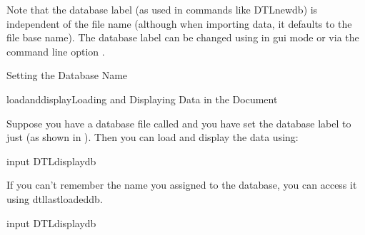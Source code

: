 Note that the database label (as used in commands like \gls{DTLnewdb})
is independent of the file name (although when importing data, it defaults 
to the file base name).  The database label can be changed using 
 in 
\gls{gui} mode or via the command line option 
.

{
}
{Setting the Database Name}

\begin{example}{loadanddisplay}{Loading and Displaying Data in the
Document}

Suppose you have a database file called 
and you have set the database label to just 
(as shown in ).
Then you can load and display the data using:
\begin{codebox}
\codepar
\gls{input}
\codepar
{}
\gls{DTLdisplaydb}
\end{codebox}

If you can't remember the name you assigned to the database, you can 
access it using \gls{dtllastloadeddb}.
\begin{codebox}
\codepar
\gls{input}
\codepar
{}
\gls{DTLdisplaydb}
\end{codebox}


\end{example}
